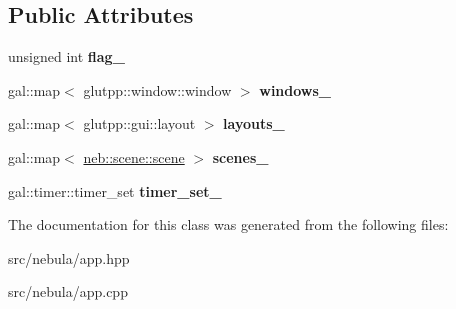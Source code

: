 \subsection*{\-Public \-Attributes}
\begin{DoxyCompactItemize}
\item 
\hypertarget{classneb_1_1app_a541f268dba5963578a9a7985db8ab465}{unsigned int {\bfseries flag\-\_\-}}\label{classneb_1_1app_a541f268dba5963578a9a7985db8ab465}

\item 
\hypertarget{classneb_1_1app_ad6b61ebea17df0281aa2f9e0caa7f675}{gal\-::map$<$ glutpp\-::window\-::window $>$ {\bfseries windows\-\_\-}}\label{classneb_1_1app_ad6b61ebea17df0281aa2f9e0caa7f675}

\item 
\hypertarget{classneb_1_1app_a5e83d509c862b9050e3840a7fe15ac01}{gal\-::map$<$ glutpp\-::gui\-::layout $>$ {\bfseries layouts\-\_\-}}\label{classneb_1_1app_a5e83d509c862b9050e3840a7fe15ac01}

\item 
\hypertarget{classneb_1_1app_ac53edb0e3764d01881d544bf27106a89}{gal\-::map$<$ \hyperlink{classneb_1_1scene_1_1scene}{neb\-::scene\-::scene} $>$ {\bfseries scenes\-\_\-}}\label{classneb_1_1app_ac53edb0e3764d01881d544bf27106a89}

\item 
\hypertarget{classneb_1_1app_a23c6f2ed724892216392a4607606f9ed}{gal\-::timer\-::timer\-\_\-set {\bfseries timer\-\_\-set\-\_\-}}\label{classneb_1_1app_a23c6f2ed724892216392a4607606f9ed}

\end{DoxyCompactItemize}


\-The documentation for this class was generated from the following files\-:\begin{DoxyCompactItemize}
\item 
src/nebula/app.\-hpp\item 
src/nebula/app.\-cpp\end{DoxyCompactItemize}
